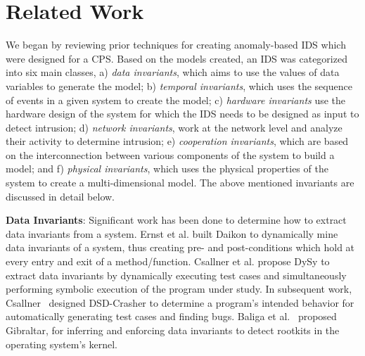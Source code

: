
\chapter{Related Work}
\label{ch:RelatedWork}

We began by reviewing prior techniques for creating anomaly-based \ac{IDS} which were designed for a \ac{CPS}. Based on the models created, an \ac{IDS} was categorized into six main classes, a) \textit{data invariants}, which aims to use the values of data variables to generate the model; b) \textit{temporal invariants}, which uses the sequence of events in a given system to create the model; c) \textit{hardware invariants} use the hardware design of the system for which the \ac{IDS} needs to be designed as input to detect intrusion; d) \textit{network invariants}, work at the network level and analyze their activity to determine intrusion; e) \textit{cooperation invariants}, which are based on the interconnection between various components of the system to build a model; and f) \textit{physical invariants}, which uses the physical properties of the system to create a multi-dimensional model. The above mentioned invariants are discussed in detail below.

\textbf{Data Invariants}: Significant work \cite{ernst2007daikon, csallner2008dysy, baliga2008automatic, baliga2011detecting, csallner2008dsd} has been done to determine how to extract data invariants from a system. Ernst et al. \cite{ernst2007daikon} built Daikon to dynamically mine data invariants of a system, thus creating pre- and post-conditions which hold at every entry and exit of a method/function.  Csallner et al. \cite{csallner2008dysy} propose DySy to extract data invariants by dynamically executing test cases and simultaneously performing symbolic execution of the program under study. In subsequent work, Csallner~\cite{csallner2008dsd} designed DSD-Crasher to determine a program's intended behavior for automatically generating test cases and finding bugs.
Baliga et al.~\cite{baliga2008automatic, baliga2011detecting} proposed Gibraltar, for inferring and enforcing data invariants to detect rootkits in the operating system's kernel.  

